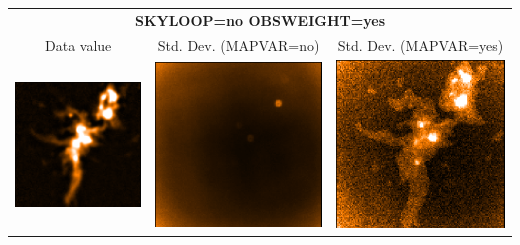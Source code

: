 \vspace{5mm}
\begin{tabular}{|ccc|}
\hline
\multicolumn{3}{|c|}{\textbf{SKYLOOP=no OBSWEIGHT=yes}} \\
Data value & Std. Dev. (MAPVAR=no) & Std. Dev. (MAPVAR=yes) \\
\includegraphics[width=\picwid]{tailoring/i2.png} &
\includegraphics[width=\picwid]{tailoring/sqvar2.png} &
\includegraphics[width=\picwid]{tailoring/disp2.png} \\
\hline
\end{tabular}

